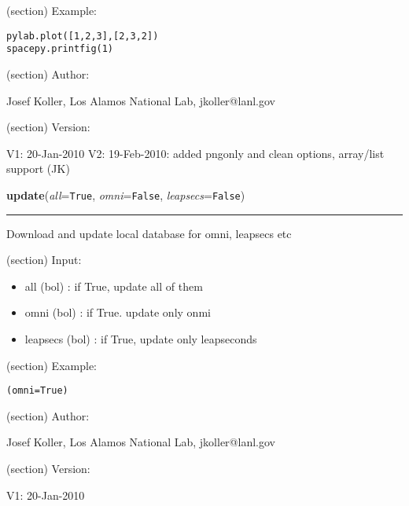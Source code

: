 \begin{boxedminipage}{\funcwidth}
\begin{itemize}
      \end{itemize}

    (section) Example:

\begin{alltt}
\pysrcprompt{{\textgreater}{\textgreater}{\textgreater} }pylab.plot([1,2,3],[2,3,2])
\pysrcprompt{{\textgreater}{\textgreater}{\textgreater} }spacepy.printfig(1)\end{alltt}
    (section) Author:

      Josef Koller, Los Alamos National Lab, jkoller@lanl.gov

    (section) Version:

      V1: 20-Jan-2010 V2: 19-Feb-2010: added pngonly and clean options, 
      array/list support (JK)

\setlength{\parskip}{1ex}
    \end{boxedminipage}

    \label{spacepy:toolbox:update}

    \vspace{0.5ex}

\hspace{.8\funcindent}\begin{boxedminipage}{\funcwidth}

    \raggedright \textbf{update}(\textit{all}={\tt True}, \textit{omni}={\tt False}, \textit{leapsecs}={\tt False})

    \vspace{-1.5ex}

    \rule{\textwidth}{0.5\fboxrule}
\setlength{\parskip}{2ex}
    Download and update local database for omni, leapsecs etc

    (section) Input:

      \begin{itemize}
      \setlength{\parskip}{0.6ex}
        \item all (bol) : if True, update all of them

        \item omni (bol) : if True. update only onmi

        \item leapsecs (bol) : if True, update only leapseconds

      \end{itemize}

    (section) Example:

\begin{alltt}
\pysrcprompt{{\textgreater}{\textgreater}{\textgreater} }(omni=True)\end{alltt}
    (section) Author:

      Josef Koller, Los Alamos National Lab, jkoller@lanl.gov

    (section) Version:

      V1: 20-Jan-2010

\setlength{\parskip}{1ex}
    \end{boxedminipage}

